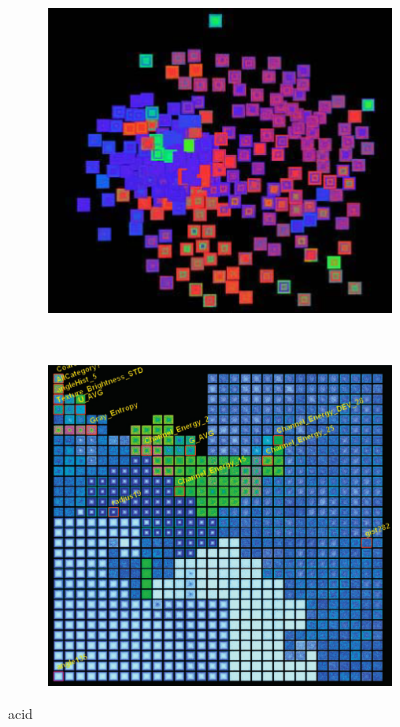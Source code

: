 \begin{figure}[h!]
    \centering
    \begin{subfigure}[b]{0.5\textwidth}
        \centering
        \includegraphics[width=\textwidth]{images/var1.png}
        \caption{}
        \label{fig:var1}
    \end{subfigure}%
    ~ %
    \begin{subfigure}[b]{0.475\textwidth}
        \centering
        \includegraphics[width=\textwidth]{images/var2.png}
        \caption{}
        \label{fig:var2}
    \end{subfigure}
    \caption[VaR: Value and Relation]{acid}
    \label{fig:corrs}
\end{figure}

